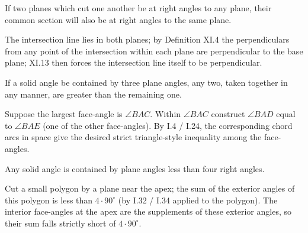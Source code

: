 \documentclass{rrxiv}
\begin{document}
\begin{claim}
\label{prop:XI.19}
If two planes which cut one another be at right angles to any plane,
their common section will also be at right angles to the same plane.
\end{claim}
\begin{evidence}[Proof of XI.19]
\label{ev:XI.19}
The intersection line lies in both planes; by Definition XI.4 the
perpendiculars from any point of the intersection within each plane
are perpendicular to the base plane; XI.13 then forces the
intersection line itself to be perpendicular.
\end{evidence}

\begin{claim}
\label{prop:XI.20}
If a solid angle be contained by three plane angles, any two, taken
together in any manner, are greater than the remaining one.
\end{claim}
\begin{evidence}[Proof of XI.20]
\label{ev:XI.20}
Suppose the largest face-angle is $\angle BAC$.  Within $\angle BAC$
construct $\angle BAD$ equal to $\angle BAE$ (one of the other
face-angles).  By I.4 / I.24, the corresponding chord arcs in space
give the desired strict triangle-style inequality among the
face-angles.
\end{evidence}

\begin{claim}
\label{prop:XI.21}
Any solid angle is contained by plane angles less than four right
angles.
\end{claim}
\begin{evidence}[Proof of XI.21]
\label{ev:XI.21}
Cut a small polygon by a plane near the apex; the sum of the
exterior angles of this polygon is less than $4 \cdot 90^\circ$ (by
I.32 / I.34 applied to the polygon).  The interior face-angles at
the apex are the supplements of these exterior angles, so their sum
falls strictly short of $4 \cdot 90^\circ$.
\end{evidence}
\end{document}
